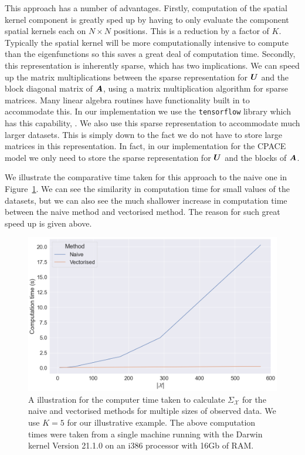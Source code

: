 This approach has a number of advantages.
Firstly, computation of the spatial kernel component is greatly sped up by having to only evaluate the component spatial kernels each on $N \times N$ positions.
This is a reduction by a factor of $K$.
Typically the spatial kernel will be more computationally intensive to compute than the eigenfunctions so this saves a great deal of computation time.
Secondly, this representation is inherently sparse, which has two implications.
We can speed up the matrix multiplications between the sparse representation for $\bm{{U}}$ and the block diagonal matrix of $\bm{{A}}$, using a matrix multiplication algorithm for sparse matrices. 
Many linear algebra routines have functionality built in to accommodate this.
In our implementation we use the \verb*|tensorflow| library which has this capability, \citep{abadi_tensorflow_2016}.
We also use this sparse representation to accommodate much larger datasets.
This is simply down to the fact we do not have to store large matrices in this representation.
In fact, in our implementation for the CPACE model we only need to store the sparse representation for $\bm{{U}}$ and the blocks of $\bm{{A}}$. 

We illustrate the comparative time taken for this approach to the naive one in Figure~\ref{fig:imp_utau}.
We can see the similarity in computation time for small values of the datasets, but we can also see the much shallower increase in computation time between the naive method and vectorised method.
The reason for such great speed up is given above.
\begin{figure}
	\centering
	\includegraphics[width=\textwidth]{imp_utau}
	\caption[An illustration for the computer time taken to calculate $\Sigma_\mathcal{X}$ for the naive and vectorised methods for multiple sizes of observed data.]{A illustration for the computer time taken to calculate $\Sigma_\mathcal{X}$ for the naive and vectorised methods for multiple sizes of observed data. We use $K = 5$ for our illustrative example. The above computation times were taken from a single machine running with the Darwin kernel Version 21.1.0 on an i386 processor with 16Gb of RAM.}
	\label{fig:imp_utau}
\end{figure}

